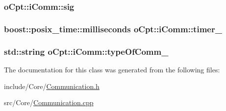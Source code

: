 \subsubsection[{\texorpdfstring{sig}{sig}}]{ o\+Cpt\+::i\+Comm\+::sig}\hypertarget{classo_cpt_1_1i_comm_aedc63b07be3c9a395638b782a634eecf}{}\label{classo_cpt_1_1i_comm_aedc63b07be3c9a395638b782a634eecf}
\subsubsection[{\texorpdfstring{timer\+\_\+}{timer_}}]{\setlength{\rightskip}{0pt plus 5cm}boost\+::posix\+\_\+time\+::milliseconds o\+Cpt\+::i\+Comm\+::timer\+\_\+\hspace{0.3cm}{\ttfamily [protected]}}\hypertarget{classo_cpt_1_1i_comm_a1e9989bd934719256f4b50123825c00e}{}\label{classo_cpt_1_1i_comm_a1e9989bd934719256f4b50123825c00e}
\subsubsection[{\texorpdfstring{type\+Of\+Comm\+\_\+}{typeOfComm_}}]{\setlength{\rightskip}{0pt plus 5cm}std\+::string o\+Cpt\+::i\+Comm\+::type\+Of\+Comm\+\_\+\hspace{0.3cm}{\ttfamily [protected]}}\hypertarget{classo_cpt_1_1i_comm_a4805d3c40171aa763f029ebe1886e24f}{}\label{classo_cpt_1_1i_comm_a4805d3c40171aa763f029ebe1886e24f}


The documentation for this class was generated from the following files\+:\begin{DoxyCompactItemize}
\item 
include/\+Core/\hyperlink{_communication_8h}{Communication.\+h}\item 
src/\+Core/\hyperlink{_communication_8cpp}{Communication.\+cpp}\end{DoxyCompactItemize}
